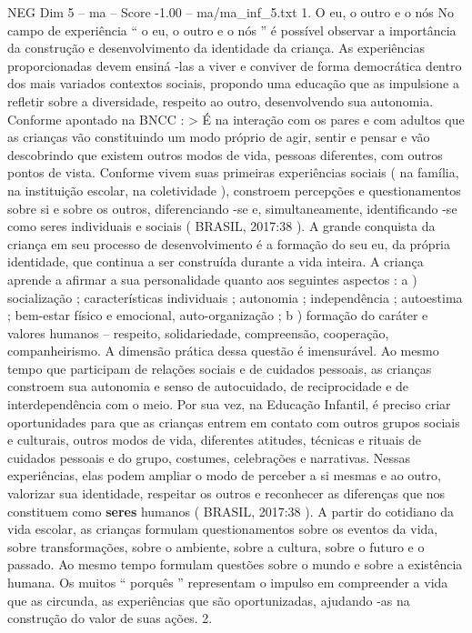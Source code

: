 \begin{textsample}{NEG Dim 5 – ma – Score -1.00 – ma/ma\_inf\_5.txt}  \label{ex:f5_neg_113}
1.
O eu, o outro e o nós No campo de experiência “ o eu, o outro e o nós ” é possível observar a importância da construção e desenvolvimento da identidade da criança.
As experiências proporcionadas devem ensiná -las a viver e conviver de forma democrática dentro dos mais variados contextos sociais, propondo uma educação que as impulsione a refletir sobre a diversidade, respeito ao outro, desenvolvendo sua autonomia.
Conforme apontado na BNCC : > É na interação com os pares e com adultos que as crianças vão constituindo um modo próprio de agir, sentir e pensar e vão descobrindo que existem outros modos de vida, pessoas diferentes, com outros pontos de vista.
Conforme vivem suas primeiras experiências sociais ( na família, na instituição escolar, na coletividade ), constroem percepções e questionamentos sobre si e sobre os outros, diferenciando -se e, simultaneamente, identificando -se como seres individuais e sociais ( BRASIL, 2017:38 ).
A grande conquista da criança em seu processo de desenvolvimento é a formação do seu eu, da própria identidade, que continua a ser construída durante a vida inteira.
A criança aprende a afirmar a sua personalidade quanto aos seguintes aspectos : a ) socialização ; características individuais ; autonomia ; independência ; autoestima ; bem-estar físico e emocional, auto-organização ; b ) formação do caráter e valores humanos – respeito, solidariedade, compreensão, cooperação, companheirismo.
A dimensão prática dessa questão é imensurável.
Ao mesmo tempo que participam de relações sociais e de cuidados pessoais, as crianças constroem sua autonomia e senso de autocuidado, de reciprocidade e de interdependência com o meio.
Por sua vez, na Educação Infantil, é preciso criar oportunidades para que as crianças entrem em contato com outros grupos sociais e culturais, outros modos de vida, diferentes atitudes, técnicas e rituais de cuidados pessoais e do grupo, costumes, celebrações e narrativas.
Nessas experiências, elas podem ampliar o modo de perceber a si mesmas e ao outro, valorizar sua identidade, respeitar os outros e reconhecer as diferenças que nos constituem como \textbf{seres} humanos ( BRASIL, 2017:38 ).
A partir do cotidiano da vida escolar, as crianças formulam questionamentos sobre os eventos da vida, sobre transformações, sobre o ambiente, sobre a cultura, sobre o futuro e o passado.
Ao mesmo tempo formulam questões sobre o mundo e sobre a existência humana.
Os muitos “ porquês ” representam o impulso em compreender a vida que as circunda, as experiências que são oportunizadas, ajudando -as na construção do valor de suas ações. 2.

\end{textsample}
